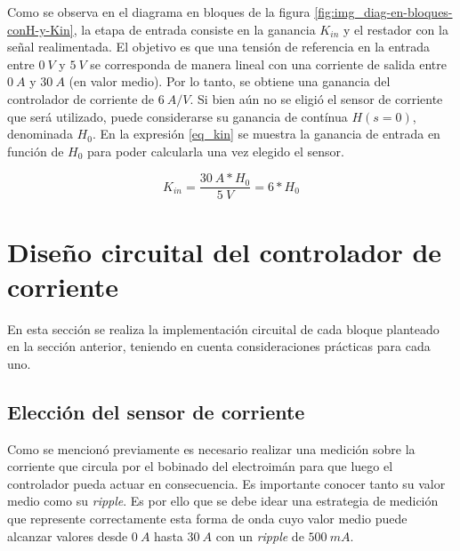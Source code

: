 Como se observa en el diagrama en bloques de la figura \ref{fig:img_diag-en-bloques-conH-y-Kin}, la etapa de entrada consiste en la ganancia $K_{in}$ y el restador con la señal realimentada. El objetivo es que una tensión de referencia en la entrada entre $0\:V$ y $5\:V$ se corresponda de manera lineal con una corriente de salida entre $0\:A$ y $30\:A$ (en valor medio). Por lo tanto, se obtiene una ganancia del controlador de corriente de $6\:A/V$. Si bien aún no se eligió el sensor de corriente que será utilizado, puede considerarse su ganancia de contínua $H(s=0)$, denominada $H_0$. En la expresión \ref{eq_kin} se muestra la ganancia de entrada en función de $H_0$ para poder calcularla una vez elegido el sensor.

\begin{equation} \label{eq_kin}
	K_{in}=\frac{30\:A*H_0}{5\:V}=6*H_0 
\end{equation}

%
%
\section{Diseño circuital del controlador de corriente}

En esta sección se realiza la implementación circuital de cada bloque planteado en la sección anterior, teniendo en cuenta consideraciones prácticas para cada uno.


\subsection{Elección del sensor de corriente}

Como se mencionó previamente es necesario realizar una medición sobre la corriente que circula por el bobinado del electroimán para que luego el controlador pueda actuar en consecuencia. Es importante conocer tanto su valor medio como su \textsl{ripple}. Es por ello que se debe idear una estrategia de medición que represente correctamente esta forma de onda cuyo valor medio puede alcanzar valores desde $0\:A$ hasta $30\:A$ con un \textsl{ripple} de $500\:mA$.

